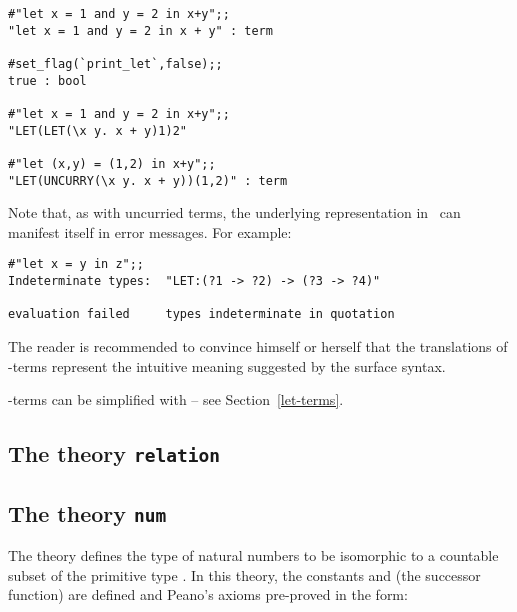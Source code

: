 \setcounter{sessioncount}{1}
\begin{session}\begin{verbatim}
#"let x = 1 and y = 2 in x+y";;
"let x = 1 and y = 2 in x + y" : term

#set_flag(`print_let`,false);;
true : bool

#"let x = 1 and y = 2 in x+y";;
"LET(LET(\x y. x + y)1)2"

#"let (x,y) = (1,2) in x+y";;
"LET(UNCURRY(\x y. x + y))(1,2)" : term
\end{verbatim}\end{session}

Note that, as with uncurried terms, the underlying representation in \HOL\ can
manifest itself in error messages. For example:

\setcounter{sessioncount}{1}
\begin{session}\begin{verbatim}
#"let x = y in z";;
Indeterminate types:  "LET:(?1 -> ?2) -> (?3 -> ?4)"

evaluation failed     types indeterminate in quotation
\end{verbatim}\end{session}

The reader is recommended to convince himself or herself that the
translations of -terms represent the intuitive meaning suggested by
the surface syntax.

-terms can be simplified with  -- see Section~\ref{let-terms}.




\subsection{The theory {\tt relation}}

\subsection{The theory {\tt num}}

The theory 
defines the type  of natural numbers to be
isomorphic to a countable subset of the primitive type .  In this
theory, the constants 
 and  (the successor function) are defined
and Peano's axioms pre-proved in the form:


